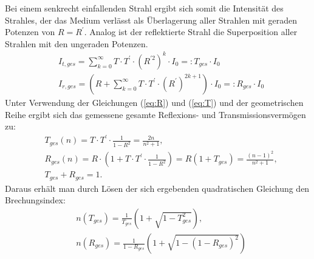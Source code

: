 	Bei einem senkrecht einfallenden Strahl ergibt sich somit die Intensität des Strahles, der das Medium verlässt als Überlagerung aller Strahlen mit geraden Potenzen von $R = R^\prime$. Analog ist der reflektierte Strahl die Superposition aller Strahlen mit den ungeraden Potenzen.
	\begin{align}
		&I_{t,ges} = \sum_{k = 0}^{\infty} T\cdot T^\prime \cdot (R^{\prime 2})^k \cdot I_0 =: T_{ges}\cdot I_0\\
		&I_{r,ges} = \left(R + \sum_{k = 0}^{\infty} T\cdot T^\prime \cdot (R^\prime)^{2k+1}\right) \cdot I_0 =: R_{ges}\cdot I_0
	\end{align}
	Unter Verwendung der Gleichungen (\ref{eq:R}) und (\ref{eq:T}) und der geometrischen Reihe ergibt sich das gemessene gesamte Reflexions- und Transmissionsvermögen zu:
	\begin{align}
			&T_{ges}(n) = T\cdot T^\prime \cdot \frac{1}{1 - R^2} = \frac{2n}{n^2 + 1},\\
			&R_{ges}(n) = R\cdot \left(1 + T\cdot T^\prime \cdot \frac{1}{1 - R^2}\right) = R (1 + T_{ges}) = \frac{(n-1)^2}{n^2+1},\\
			&T_{ges} + R_{ges} = 1.
	\end{align}
	Daraus erhält man durch Lösen der sich ergebenden quadratischen Gleichung den Brechungsindex:
	\begin{align}
		&n(T_{ges}) = \frac{1}{T_{ges}}\left(1 + \sqrt{1 - T_{ges}^2}\right), \label{eq:n_T}\\
		&n(R_{ges}) = \frac{1}{1 - R_{ges}}\left(1 + \sqrt{1 - (1 - R_{ges})^2}\right) \label{eq:n_R}
	\end{align}
	